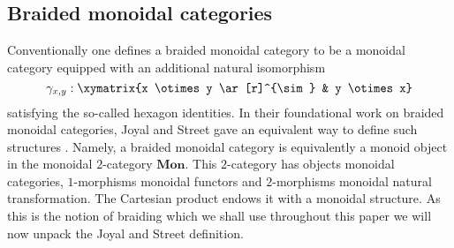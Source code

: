 \subsection{Braided monoidal categories}
\label{DefnBraiding}
Conventionally one defines a braided monoidal category to be a monoidal category equipped with an additional natural isomorphism \[\gamma_{x,y}: \xymatrix{x \otimes y \ar[r]^{\sim} & y \otimes x}\] satisfying the so-called hexagon identities. 
In their foundational work on braided monoidal categories, Joyal and Street gave an equivalent way to define such structures \cite{Joyal-StreetBTC}. Namely, a braided monoidal category is equivalently a monoid object in the monoidal $2$-category $\mathbf{Mon}$. This $2$-category has objects monoidal categories, $1$-morphisms monoidal functors and $2$-morphisms monoidal natural transformation. The Cartesian product endows it with a monoidal structure. %
As this is the notion of braiding which we shall use throughout this paper we will now unpack the Joyal and Street definition.

